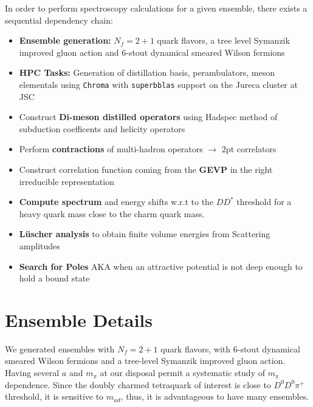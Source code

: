 In order to perform spectroscopy calculations for a given ensemble, there exists a sequential dependency chain:
\begin{itemize}
     \setlength\itemsep{1em}
        \item[\checkmark] \textbf{Ensemble generation:} $N_f = 2+1$ quark flavors, a tree level Symanzik improved gluon action and 6-stout dynamical smeared Wilson fermions
        \item[\checkmark] \textbf{HPC Tasks:} Generation of distillation basis, perambulators, meson elementals using \texttt{Chroma} with \texttt{superbblas} support on the Jureca cluster at JSC
        \item Construct \textbf{Di-meson distilled operators} using Hadspec method of subduction coefficents and helicity operators
        \item[\checkmark] Perform \textbf{contractions} of multi-hadron operators $\to$ 2pt correlators
        \item Construct correlation function coming from the \textbf{GEVP} in the right irreducible representation
        \item \textbf{Compute spectrum} and energy shifts w.r.t to the $DD^*$ threshold for a heavy quark mass close to the charm quark mass.
        \item \textbf{L\"uscher analysis} to obtain finite volume energies from Scattering amplitudes
        \item \textbf{Search for Poles} AKA when an attractive potential is not deep enough to hold a bound state
    \end{itemize}

\section{Ensemble Details}
We generated ensembles with $N_f = 2+1$ quark flavors, with 6-stout dynamical smeared Wilson fermions and a tree-level Symanzik improved gluon action. Having several $a$ and $m_{\pi}$ at our disposal permit a systematic study of $m_{\pi}$ dependence. Since the doubly charmed tetraquark of interest is close to $D^0D^0\pi^+$ threshold, it is sensitive to $m_{ud}$, thus, it is advantageous to have many ensembles. 
\\ 


